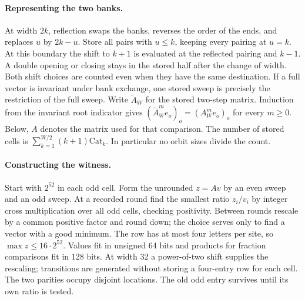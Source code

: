 \documentclass[11pt]{article}
\begin{document}
\paragraph{Representing the two banks.}
At width \(2k\), reflection swaps the banks, reverses the order of the ends, and replaces \(u\) by \(2k-u\). Store all pairs with \(u\le k\), keeping every pairing at \(u=k\). At this boundary the shift to \(k+1\) is evaluated at the reflected pairing and \(k-1\). A double opening or closing stays in the stored half after the change of width. Both shift choices are counted even when they have the same destination. If a full vector is invariant under bank exchange, one stored sweep is precisely the restriction of the full sweep. Write \(\widetilde A_W\) for the stored two-step matrix. Induction from the invariant root indicator gives \((\widetilde A_W^m e_o)_o=(A_W^m e_o)_o\) for every \(m\ge0\). Below, \(A\) denotes the matrix used for that comparison. The number of stored cells is \(\sum_{k=1}^{W/2}(k+1)\mathrm{Cat}_k\). In particular no orbit sizes divide the count.

\paragraph{Constructing the witness.}
Start with \(2^{52}\) in each odd cell. Form the unrounded \(z=Av\) by an even sweep and an odd sweep. At a recorded round find the smallest ratio \(z_i/v_i\) by integer cross multiplication over all odd cells, checking positivity. Between rounds rescale by a common positive factor and round down; the choice serves only to find a vector with a good minimum. The row has at most four letters per site, so \(\max z\le16\cdot 2^{52}\). Values fit in unsigned 64 bits and products for fraction comparisons fit in 128 bits. At width 32 a power-of-two shift supplies the rescaling; transitions are generated without storing a four-entry row for each cell. The two parities occupy disjoint locations. The old odd entry survives until its own ratio is tested.
\end{document}
